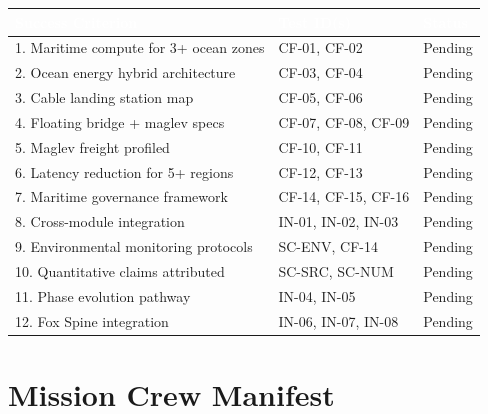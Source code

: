 \documentclass[11pt,letterpaper]{article}
\newcommand{\tableheader}[1]{\textbf{\sffamily\textcolor{white}{#1}}}
\begin{document}
\begin{center}
\begin{tabularx}{\textwidth}{XL{3.5cm}C{1.5cm}}
\toprule
{}
\tableheader{Success Criterion} & \tableheader{Test ID(s)} & \tableheader{Status} \\
. Maritime compute for 3+ ocean zones & CF-01, CF-02 & Pending \\
2. Ocean energy hybrid architecture & CF-03, CF-04 & Pending \\
3. Cable landing station map & CF-05, CF-06 & Pending \\
4. Floating bridge + maglev specs & CF-07, CF-08, CF-09 & Pending \\
5. Maglev freight profiled & CF-10, CF-11 & Pending \\
6. Latency reduction for 5+ regions & CF-12, CF-13 & Pending \\
7. Maritime governance framework & CF-14, CF-15, CF-16 & Pending \\
8. Cross-module integration & IN-01, IN-02, IN-03 & Pending \\
9. Environmental monitoring protocols & SC-ENV, CF-14 & Pending \\
10. Quantitative claims attributed & SC-SRC, SC-NUM & Pending \\
11. Phase evolution pathway & IN-04, IN-05 & Pending \\
12. Fox Spine integration & IN-06, IN-07, IN-08 & Pending \\
\bottomrule
\end{tabularx}
\end{center}

\section{Mission Crew Manifest}
\end{document}

